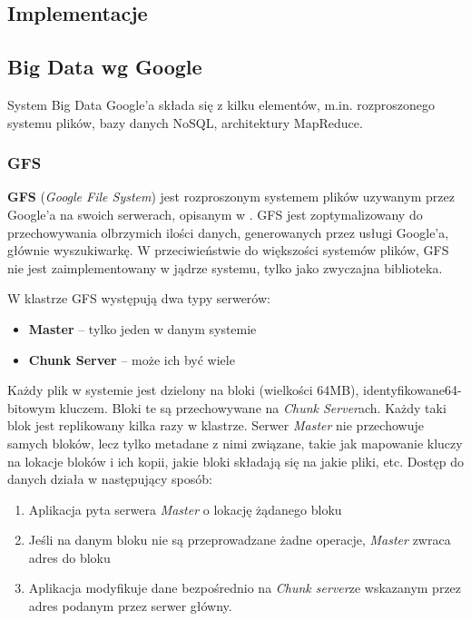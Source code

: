 \subsection{Implementacje}

\subsection{Big Data wg Google}
\label{ssub:google}
System Big Data Google'a składa się z kilku elementów, m.in. rozproszonego systemu plików, bazy danych NoSQL, architektury MapReduce.

\subsubsection{GFS}
\label{ssub:gfs}
\textbf{GFS} (\textit{Google File System}) jest rozproszonym systemem plików uzywanym przez Google'a na swoich serwerach, opisanym w \cite{ghemawat03}. GFS jest zoptymalizowany do przechowywania olbrzymich ilości danych, generowanych przez usługi Google'a, głównie wyszukiwarkę. W przeciwieństwie do większości systemów plików, GFS nie jest zaimplementowany w jądrze systemu, tylko jako zwyczajna biblioteka.

W klastrze GFS występują dwa typy serwerów:
\begin{itemize}
    \item \textbf{Master} -- tylko jeden w danym systemie
    \item \textbf{Chunk Server} -- może ich być wiele
\end{itemize}
Każdy plik w systemie jest dzielony na bloki (wielkości 64MB), identyfikowane64-bitowym kluczem. Bloki te są przechowywane na \textit{Chunk Server}ach. Każdy taki blok jest replikowany kilka razy w klastrze.
Serwer \textit{Master} nie przechowuje samych bloków, lecz tylko metadane z nimi związane, takie jak mapowanie kluczy na lokacje bloków i ich kopii, jakie bloki składają się na jakie pliki, etc.
Dostęp do danych działa w następujący sposób:
\begin{enumerate}
    \item Aplikacja pyta serwera \textit{Master} o lokację żądanego bloku
    \item Jeśli na danym bloku nie są przeprowadzane żadne operacje, \textit{Master} zwraca adres do bloku
    \item Aplikacja modyfikuje dane bezpośrednio na \textit{Chunk server}ze wskazanym przez adres podanym przez serwer główny.
\end{enumerate}

